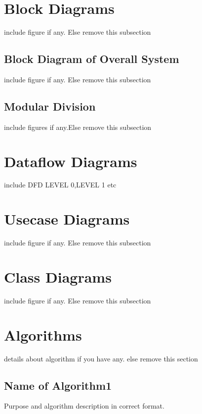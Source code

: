 \documentclass[11pt]{report}
\begin{document}
\section{Block Diagrams} 
include figure if any. Else remove this subsection

\subsection{Block Diagram of Overall System}
include figure if any. Else remove this subsection

\subsection{Modular Division}
include figures if any.Else remove this subsection


\section{Dataflow Diagrams}

include DFD LEVEL 0,LEVEL 1 etc


\section{Usecase Diagrams} 
include figure if any. Else remove this subsection


\section{Class Diagrams} 

include figure if any. Else remove this subsection


\section{Algorithms}
details about algorithm if you have any. else remove this section

\subsection{Name of Algorithm1}
Purpose and algorithm description in correct format. %
\end{document}
